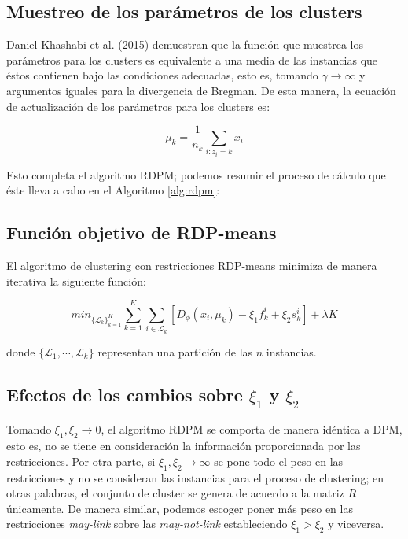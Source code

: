 \subsection{Muestreo de los parámetros de los clusters}

Daniel Khashabi et al. (2015) \cite{RDPM:2015} demuestran que la función que muestrea los parámetros para los clusters es equivalente a una media de las instancias que éstos contienen bajo las condiciones adecuadas, esto es, tomando $\gamma \rightarrow \infty$ y argumentos iguales para la divergencia de Bregman. De esta manera, la ecuación de actualización de los parámetros para los clusters es:

\begin{equation}
\mu_k = \frac{1}{n_k} \sum_{i:z_i = k} x_i
\label{eqn61}
\end{equation}

Esto completa el algoritmo \acf{RDPM}; podemos resumir el proceso de cálculo que éste lleva a cabo en el Algoritmo \ref{alg:rdpm}:

\subsection{Función objetivo de RDP-means}

\begin{teorema}
	
	El algoritmo de clustering con restricciones RDP-means minimiza de manera iterativa la siguiente función:
	
	\begin{equation}
	min_{\{\mathcal{L}_k\}_{k=1}^K} \sum_{k=1}^{K} \sum_{i \in \mathcal{L}_k} \left[D_{\phi}(x_i, \mu_k) - \xi_1 f_{k}^i  + \xi_2 s_{k}^i\right] + \lambda K
	\label{eqn60}
	\end{equation}
	
	donde $\{\mathcal{L}_1, \cdots, \mathcal{L}_k\}$ representan una partición de las $n$ instancias.
	
\end{teorema}

\subsection{Efectos de los cambios sobre $\xi_1$ y $\xi_2$}

Tomando $\xi_1, \xi_2 \rightarrow 0$, el algoritmo \acs{RDPM} se comporta de manera idéntica a \acs{DPM}, esto es, no se tiene en consideración la información proporcionada por las restricciones. Por otra parte, si $\xi_1, \xi_2 \rightarrow \infty$ se pone todo el peso en las restricciones y no se consideran las instancias para el proceso de clustering; en otras palabras, el conjunto de cluster se genera de acuerdo a la matriz $R$ únicamente. De manera similar, podemos escoger poner más peso en las restricciones \textit{may-link} sobre las \textit{may-not-link} estableciendo $\xi_1 > \xi_2$ y viceversa.

